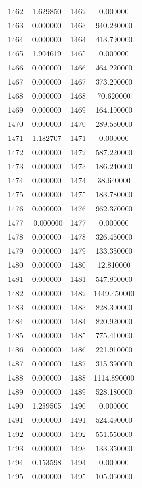 \documentclass[12pt]{article}
\begin{document}
\begin{longtable}{@{}cccc@{}}
1462 & 1.629850 & 1462 & 0.000000 \\
1463 & 0.000000 & 1463 & 940.230000 \\
1464 & 0.000000 & 1464 & 413.790000 \\
1465 & 1.904619 & 1465 & 0.000000 \\
1466 & 0.000000 & 1466 & 464.220000 \\
1467 & 0.000000 & 1467 & 373.200000 \\
1468 & 0.000000 & 1468 & 70.620000 \\
1469 & 0.000000 & 1469 & 164.100000 \\
1470 & 0.000000 & 1470 & 289.560000 \\
1471 & 1.182707 & 1471 & 0.000000 \\
1472 & 0.000000 & 1472 & 587.220000 \\
1473 & 0.000000 & 1473 & 186.240000 \\
1474 & 0.000000 & 1474 & 38.640000 \\
1475 & 0.000000 & 1475 & 183.780000 \\
1476 & 0.000000 & 1476 & 962.370000 \\
1477 & -0.000000 & 1477 & 0.000000 \\
1478 & 0.000000 & 1478 & 326.460000 \\
1479 & 0.000000 & 1479 & 133.350000 \\
1480 & 0.000000 & 1480 & 12.810000 \\
1481 & 0.000000 & 1481 & 547.860000 \\
1482 & 0.000000 & 1482 & 1449.450000 \\
1483 & 0.000000 & 1483 & 828.300000 \\
1484 & 0.000000 & 1484 & 820.920000 \\
1485 & 0.000000 & 1485 & 775.410000 \\
1486 & 0.000000 & 1486 & 221.910000 \\
1487 & 0.000000 & 1487 & 315.390000 \\
1488 & 0.000000 & 1488 & 1114.890000 \\
1489 & 0.000000 & 1489 & 528.180000 \\
1490 & 1.259505 & 1490 & 0.000000 \\
1491 & 0.000000 & 1491 & 524.490000 \\
1492 & 0.000000 & 1492 & 551.550000 \\
1493 & 0.000000 & 1493 & 133.350000 \\
1494 & 0.153598 & 1494 & 0.000000 \\
1495 & 0.000000 & 1495 & 105.060000 \\

\end{longtable}
\end{document}
